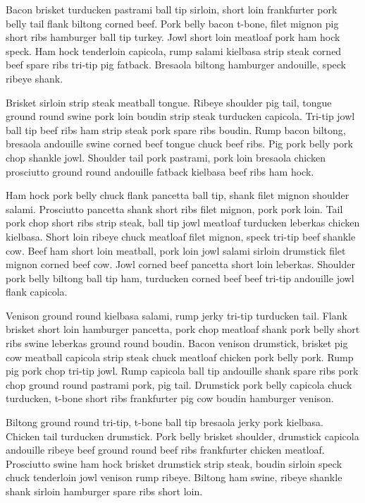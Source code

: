 Bacon brisket turducken pastrami ball tip sirloin, short loin frankfurter pork belly tail flank biltong corned beef. Pork belly bacon t-bone, filet mignon pig short ribs hamburger ball tip turkey. Jowl short loin meatloaf pork ham hock speck. Ham hock tenderloin capicola, rump salami kielbasa strip steak corned beef spare ribs tri-tip pig fatback. Bresaola biltong hamburger andouille, speck ribeye shank.

Brisket sirloin strip steak meatball tongue. Ribeye shoulder pig tail, tongue ground round swine pork loin boudin strip steak turducken capicola. Tri-tip jowl ball tip beef ribs ham strip steak pork spare ribs boudin. Rump bacon biltong, bresaola andouille swine corned beef tongue chuck beef ribs. Pig pork belly pork chop shankle jowl. Shoulder tail pork pastrami, pork loin bresaola chicken prosciutto ground round andouille fatback kielbasa beef ribs ham hock.

Ham hock pork belly chuck flank pancetta ball tip, shank filet mignon shoulder salami. Prosciutto pancetta shank short ribs filet mignon, pork pork loin. Tail pork chop short ribs strip steak, ball tip jowl meatloaf turducken leberkas chicken kielbasa. Short loin ribeye chuck meatloaf filet mignon, speck tri-tip beef shankle cow. Beef ham short loin meatball, pork loin jowl salami sirloin drumstick filet mignon corned beef cow. Jowl corned beef pancetta short loin leberkas. Shoulder pork belly biltong ball tip ham, turducken corned beef beef tri-tip andouille jowl flank capicola.

Venison ground round kielbasa salami, rump jerky tri-tip turducken tail. Flank brisket short loin hamburger pancetta, pork chop meatloaf shank pork belly short ribs swine leberkas ground round boudin. Bacon venison drumstick, brisket pig cow meatball capicola strip steak chuck meatloaf chicken pork belly pork. Rump pig pork chop tri-tip jowl. Rump capicola ball tip andouille shank spare ribs pork chop ground round pastrami pork, pig tail. Drumstick pork belly capicola chuck turducken, t-bone short ribs frankfurter pig cow boudin hamburger venison.

Biltong ground round tri-tip, t-bone ball tip bresaola jerky pork kielbasa. Chicken tail turducken drumstick. Pork belly brisket shoulder, drumstick capicola andouille ribeye beef ground round beef ribs frankfurter chicken meatloaf. Prosciutto swine ham hock brisket drumstick strip steak, boudin sirloin speck chuck tenderloin jowl venison rump ribeye. Biltong ham swine, ribeye shankle shank sirloin hamburger spare ribs short loin.

